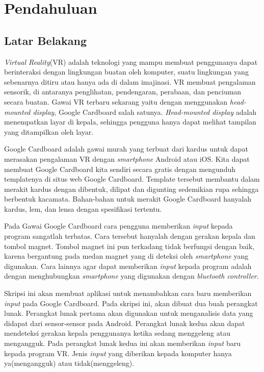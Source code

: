 \chapter{Pendahuluan}
\label{chap:pendahuluan}

\section{Latar Belakang}
\label{sec:latar_belakang}

\textit{Virtual Reality}(VR) adalah teknologi yang mampu membuat penggunanya dapat berinteraksi dengan lingkungan buatan oleh komputer, suatu lingkungan yang sebenarnya ditiru atau hanya ada di dalam imajinasi.\cite{parisi_2015} VR membuat pengalaman sensorik, di antaranya penglihatan, pendengaran, perabaan, dan penciuman secara buatan.\cite{kim_2005} Gawai VR terbaru sekarang yaitu dengan menggunakan \textit{head-mounted display}, Google Cardboard salah satunya. \textit{Head-mounted display} adalah menempatkan layar di kepala, sehingga pengguna hanya dapat melihat tampilan yang ditampilkan oleh layar.\cite{vince_2004}

Google Cardboard\cite{googlevr} adalah gawai murah yang terbuat dari kardus untuk dapat merasakan pengalaman VR dengan \textit{smartphone} Android atau iOS. Kita dapat membuat Google Cardboard kita sendiri secara gratis dengan mengunduh templatenya di situs web Google Cardboard. \cite{googlevr}Template tersebut membantu dalam merakit kardus dengan dibentuk, dilipat dan digunting sedemikian rupa sehingga berbentuk kacamata. Bahan-bahan untuk merakit Google Cardboard hanyalah kardus, lem, dan lensa dengan spesifikasi tertentu.

Pada Gawai Google Cardboard cara pengguna memberikan \textit{input} kepada program sangatlah terbatas. Cara tersebut hanyalah dengan gerakan kepala dan tombol magnet. Tombol magnet ini pun terkadang tidak berfungsi dengan baik, karena bergantung pada medan magnet yang di deteksi oleh \textit{smartphone} yang digunakan. Cara lainnya agar dapat memberikan \textit{input} kepada program adalah dengan menghubungkan \textit{smartphone} yang digunakan dengan \textit{bluetooth controller}. 

Skripsi ini akan membuat aplikasi untuk menambahkan cara baru  memberikan \textit{input} pada Google Cardboard. Pada skripsi ini, akan dibuat dua buah perangkat lunak. Perangkat lunak pertama akan digunakan untuk menganalisis data yang didapat dari sensor-sensor pada Android. Perangkat lunak kedua akan dapat mendeteksi gerakan kepala penggunanya ketika sedang menggeleng atau mengangguk. Pada perangkat lunak kedua ini akan memberikan \textit{input} baru kepada program VR. Jenis \textit{input} yang diberikan kepada komputer hanya ya(mengangguk) atau tidak(menggeleng).

